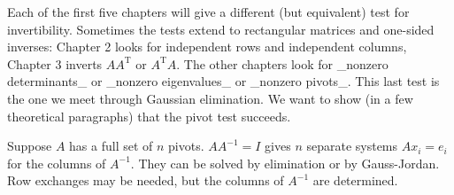 Each of the first five chapters will give a different (but equivalent) test for invertibility. Sometimes the tests extend to rectangular matrices and one-sided inverses: Chapter 2 looks for independent rows and independent columns, Chapter 3 inverts \(AA^{\text{T}}\) or \(A^{\text{T}}A\). The other chapters look for _nonzero determinants_ or _nonzero eigenvalues_ or _nonzero pivots_. This last test is the one we meet through Gaussian elimination. We want to show (in a few theoretical paragraphs) that the pivot test succeeds.

Suppose \(A\) has a full set of \(n\) pivots. \(AA^{-1}=I\) gives \(n\) separate systems \(Ax_{i}=e_{i}\) for the columns of \(A^{-1}\). They can be solved by elimination or by Gauss-Jordan. Row exchanges may be needed, but the columns of \(A^{-1}\) are determined.

 